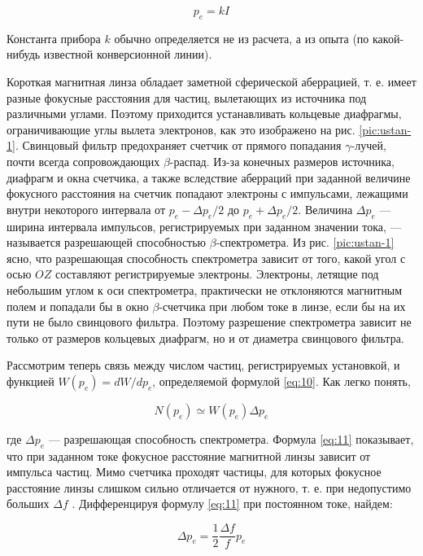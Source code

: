 \documentclass[a4paper,12pt]{article}
\begin{document}
\begin{equation}\label{eq:12}
    p_e = kI
\end{equation}

Константа прибора $k$ обычно определяется не из расчета, а из опыта (по какой-нибудь известной конверсионной линии).


Короткая магнитная линза обладает заметной сферической аберрацией, т. е. имеет разные фокусные расстояния для частиц, вылетающих из источника под различными углами. Поэтому приходится устанавливать кольцевые диафрагмы, ограничивающие углы вылета электронов, как это изображено на рис. \ref{pic:ustan-1}. Свинцовый фильтр предохраняет счетчик от прямого попадания $\gamma$-лучей, почти всегда сопровождающих $\beta$-распад. Из-за конечных размеров источника, диафрагм и окна счетчика, а также вследствие аберраций при заданной величине фокусного расстояния на счетчик попадают электроны с импульсами, лежащими внутри некоторого интервала от $p_e - \Delta p_e/2$ до $p_e + \Delta p_e/2$. Величина $\Delta p_e$ — ширина интервала импульсов, регистрируемых при заданном значении тока, — называется разрешающей способностью $\beta$-спектрометра. Из рис. \ref{pic:ustan-1} ясно, что разрешающая способность спектрометра зависит от того, какой угол с осью $OZ$ составляют регистрируемые электроны. Электроны, летящие под небольшим углом к оси спектрометра, практически не отклоняются магнитным полем и попадали бы в окно $\beta$-счетчика при любом токе в линзе, если бы на их пути не было свинцового фильтра. Поэтому разрешение спектрометра зависит не только от размеров кольцевых диафрагм, но и от диаметра свинцового фильтра.

Рассмотрим теперь связь между числом частиц, регистрируемых установкой, и функцией $W (p_e) = dW/dp_e$, определяемой формулой \eqref{eq:10}. Как легко понять,

\begin{equation}\label{eq:13}
    N (p_e) \simeq W(p_e) \Delta p_e
\end{equation}

где $\Delta p_e$ — разрешающая способность спектрометра. Формула \eqref{eq:11} показывает, что при заданном токе фокусное расстояние магнитной линзы зависит от импульса частиц. Мимо счетчика проходят частицы, для которых фокусное расстояние линзы слишком сильно отличается от нужного, т. е. при недопустимо больших $\Delta f$ . Дифференцируя формулу \eqref{eq:11} при постоянном токе, найдем:

\begin{equation}\label{eq:14}
    \Delta p_e = \frac{1}{2} \frac{\Delta f}{f} p_e
\end{equation}
\end{document}
